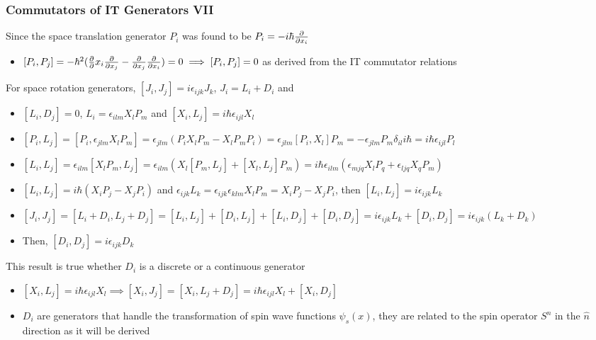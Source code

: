 \documentclass[8pt,t,mathserif,aspectratio=169]{beamer}
\begin{document}
\begin{frame}
  \frametitle{Commutators of IT Generators VII}
  \vspace{1mm}
  Since the space translation generator $P_i$ was found to be $P_i = -i \hbar {\partial \over \partial x_i}$
  \begin{itemize}
    \item $[P_i,P_j] = - \hbar^2 ({\partial \over \partial} x_i {\partial \over \partial x_j} - {\partial \over \partial x_j} {\partial \over \partial x_i}) = 0 \implies [P_i,P_j] = 0$ as derived from the IT commutator relations
  \end{itemize}
  For space rotation generators, $[J_i,J_j] = i \epsilon_{ijk} J_k$, $J_i = L_i + D_i$ and
  \begin{itemize}
    \item $[L_i,D_j] = 0$, $L_i = \epsilon_{ilm} X_l P_m$ and $[X_i,L_j] = i \hbar \epsilon_{ijl} X_l$
    \item $[P_i,L_j] = [P_i,\epsilon_{jlm} X_l P_m] = \epsilon_{jlm} (P_i X_l P_m - X_l P_m P_i) = \epsilon_{jlm} [P_i,X_l] P_m = -\epsilon_{jlm} P_m \delta_{il} i \hbar = i \hbar \epsilon_{ijl} P_l$
    \item $[L_i,L_j] = \epsilon_{ilm} [X_l P_m,L_j] = \epsilon_{ilm} (X_l [P_m,L_j] + [X_l,L_j] P_m) = i \hbar \epsilon_{ilm} (\epsilon_{mjq} X_l P_q + \epsilon_{ljq} X_q P_m)$
    \item $[L_i,L_j] = i \hbar (X_i P_j - X_j P_i)$ and $\epsilon_{ijk} L_k = \epsilon_{ijk} \epsilon_{klm} X_l P_m = X_i P_j - X_j P_i$, then $[L_i,L_j] = i \epsilon_{ijk} L_k$
    \item $[J_i,J_j] = [L_i + D_i,L_j + D_j] = [L_i,L_j] + [D_i,L_j] + [L_i,D_j] + [D_i,D_j] = i \epsilon_{ijk} L_k + [D_i,D_j] = i \epsilon_{ijk} (L_k + D_k)$
    \item Then, $[D_i,D_j] = i \epsilon_{ijk} D_k$
  \end{itemize}
  This result is true whether $D_i$ is a discrete or a continuous generator
  \begin{itemize}
    \item $[X_i,L_j] = i \hbar \epsilon_{ijl} X_l \implies [X_i,J_j] = [X_i,L_j + D_j] = i \hbar \epsilon_{ijl} X_l + [X_i,D_j]$
    \item $D_i$ are generators that handle the transformation of spin wave functions $\psi_s(x)$, they are related to the spin operator $S^n$ in the $\hat{n}$ direction as it will be derived
  \end{itemize}
\end{frame}
\end{document}

